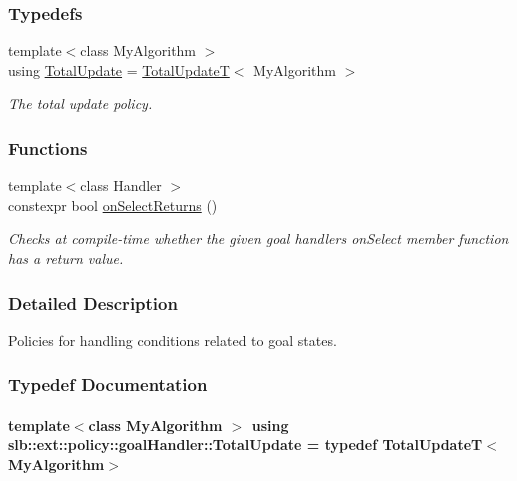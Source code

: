 \subsubsection*{Typedefs}
\begin{DoxyCompactItemize}
\item 
{\footnotesize template$<$class My\+Algorithm $>$ }\\using \hyperlink{namespaceslb_1_1ext_1_1policy_1_1goalHandler_a75edd9c8ad913d3ccb32e7cbafe5cdc5}{Total\+Update} = \hyperlink{structslb_1_1ext_1_1policy_1_1goalHandler_1_1TotalUpdateT}{Total\+UpdateT}$<$ My\+Algorithm $>$
\begin{DoxyCompactList}\small\item\em The total update policy. \end{DoxyCompactList}\end{DoxyCompactItemize}
\subsubsection*{Functions}
\begin{DoxyCompactItemize}
\item 
{\footnotesize template$<$class Handler $>$ }\\constexpr bool \hyperlink{namespaceslb_1_1ext_1_1policy_1_1goalHandler_aeab06a49da40c2c3c1a7c1dd2ac71b4e}{on\+Select\+Returns} ()
\begin{DoxyCompactList}\small\item\em Checks at compile-\/time whether the given goal handler\textquotesingle{}s {\ttfamily on\+Select} member function has a return value. \end{DoxyCompactList}\end{DoxyCompactItemize}


\subsubsection{Detailed Description}
Policies for handling conditions related to goal states. 

\subsubsection{Typedef Documentation}
\paragraph[{\texorpdfstring{Total\+Update}{TotalUpdate}}]{\setlength{\rightskip}{0pt plus 5cm}template$<$class My\+Algorithm $>$ using {\bf slb\+::ext\+::policy\+::goal\+Handler\+::\+Total\+Update} = typedef {\bf Total\+UpdateT}$<$My\+Algorithm$>$}\hypertarget{namespaceslb_1_1ext_1_1policy_1_1goalHandler_a75edd9c8ad913d3ccb32e7cbafe5cdc5}{}\label{namespaceslb_1_1ext_1_1policy_1_1goalHandler_a75edd9c8ad913d3ccb32e7cbafe5cdc5}



